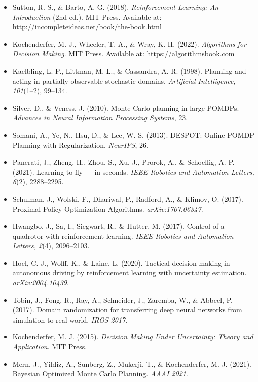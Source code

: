 \documentclass[11pt]{article}
\begin{document}
\begin{itemize}[leftmargin=1.8em]
    \item Sutton, R. S., \& Barto, A. G. (2018). \textit{Reinforcement Learning: An Introduction} (2nd ed.). MIT Press. Available at: \url{http://incompleteideas.net/book/the-book.html}

    \item Kochenderfer, M. J., Wheeler, T. A., \& Wray, K. H. (2022). \textit{Algorithms for Decision Making}. MIT Press. Available at: \url{https://algorithmsbook.com}

    \item Kaelbling, L. P., Littman, M. L., \& Cassandra, A. R. (1998). Planning and acting in partially observable stochastic domains. \textit{Artificial Intelligence, 101}(1--2), 99--134.

    \item Silver, D., \& Veness, J. (2010). Monte-Carlo planning in large POMDPs. \textit{Advances in Neural Information Processing Systems}, 23.

    \item Somani, A., Ye, N., Hsu, D., \& Lee, W. S. (2013). DESPOT: Online POMDP Planning with Regularization. \textit{NeurIPS}, 26.

    \item Panerati, J., Zheng, H., Zhou, S., Xu, J., Prorok, A., \& Schoellig, A. P. (2021). Learning to fly --- in seconds. \textit{IEEE Robotics and Automation Letters, 6}(2), 2288--2295.

    \item Schulman, J., Wolski, F., Dhariwal, P., Radford, A., \& Klimov, O. (2017). Proximal Policy Optimization Algorithms. \textit{arXiv:1707.06347}.

    \item Hwangbo, J., Sa, I., Siegwart, R., \& Hutter, M. (2017). Control of a quadrotor with reinforcement learning. \textit{IEEE Robotics and Automation Letters, 2}(4), 2096--2103.

    \item Hoel, C.-J., Wolff, K., \& Laine, L. (2020). Tactical decision-making in autonomous driving by reinforcement learning with uncertainty estimation. \textit{arXiv:2004.10439}.

    \item Tobin, J., Fong, R., Ray, A., Schneider, J., Zaremba, W., \& Abbeel, P. (2017). Domain randomization for transferring deep neural networks from simulation to real world. \textit{IROS 2017}.

    \item Kochenderfer, M. J. (2015). \textit{Decision Making Under Uncertainty: Theory and Application}. MIT Press.

    \item Mern, J., Yildiz, A., Sunberg, Z., Mukerji, T., \& Kochenderfer, M. J. (2021). Bayesian Optimized Monte Carlo Planning. \textit{AAAI 2021}.
\end{itemize}
\end{document}
